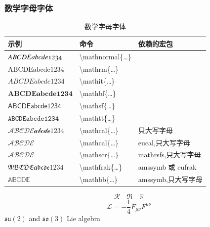 \documentclass[a4paper]{ctexart}
\begin{document}
    \subsubsection{数学字母字体}
    \begin{table}[H]
        \centering
        \caption{数学字母字体}
        \begin{tabular}{lll}
            \toprule
            示例 &命令 &依赖的宏包\\
            \midrule
            $\mathnormal{ABCDEabcde1234}$   & \textbackslash mathnormal\{\ldots\}   &                     \\
            $\mathrm{ABCDEabcde1234}$       & \textbackslash mathrm\{\ldots\}       &                     \\
            $\mathit{ABCDEabcde1234}$       & \textbackslash mathit\{\ldots\}       &                     \\
            $\mathbf{ABCDEabcde1234}$       & \textbackslash mathbf\{\ldots\}       &                     \\
            $\mathsf{ABCDEabcde1234}$       & \textbackslash mathsf\{\ldots\}       &                     \\
            $\mathtt{ABCDEabcde1234}$       & \textbackslash mathtt\{\ldots\}       &                     \\
            $\mathcal{ABCDEabcde1234}$      & \textbackslash mathcal\{\ldots\}      & 只大写字母            \\
            \midrule
            $\mathcal{ABCDE}$               & \textbackslash mathcal\{\ldots\}      & eucal,只大写字母      \\
            $\mathscr{ABCDE}$               & \textbackslash mathscr\{\ldots\}      & mathrsfs,只大写字母   \\
            $\mathfrak{ABCDEabcde1234}$     & \textbackslash mathfrak\{\ldots\}     & amssymb 或 eufrak    \\
            $\mathbb{ABCDE}$                & \textbackslash mathbb\{\ldots\}       & amssymb,只大写字母    \\
            \bottomrule
        \end{tabular}
    \end{table}
    \[ \mathcal{R} \quad \mathfrak{R \quad \mathbb{R}} \]
    \[ \mathcal{L} = -\frac{1}{4}F_{\mu\nu}F^{\mu\nu} \]
    $\mathfrak{su}(2)$ and $\mathfrak{so}(3)$ Lie algebra
\end{document}
